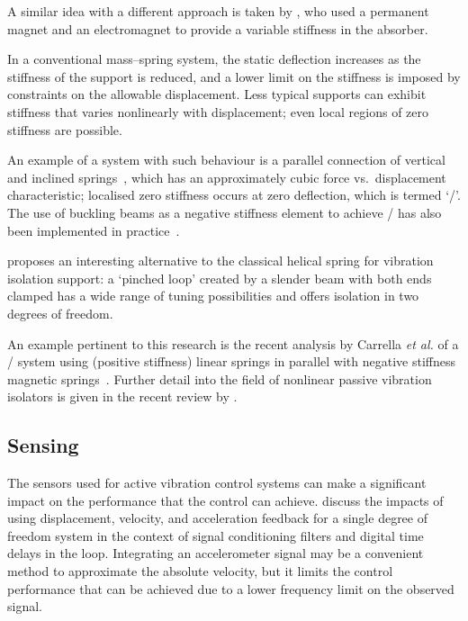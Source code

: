A similar idea with a different approach is taken by
\textcite{liu2006a}, who used a permanent magnet and an electromagnet
to provide a variable stiffness in the absorber.

In a conventional mass--spring system, the static deflection increases
as the stiffness of the support is reduced, and a lower limit on the
stiffness is imposed by constraints on the allowable
displacement.
Less typical supports can exhibit stiffness that varies
nonlinearly with displacement; even local regions of zero stiffness
are possible.

An example of a system with such behaviour is a parallel
connection of vertical and inclined
springs~\cite{molyneux1957,alabuzhev1989,carrella2006,carrella2007},
which has an approximately cubic force vs.\ displacement
characteristic; localised zero stiffness occurs at zero deflection,
which is termed `\qzs/'.
The use of buckling beams as a negative
stiffness element to achieve \qzs/ has also been implemented in
practice~\cite{platus1999,tarnai2003}.

\textcite{virgin2008} proposes an interesting alternative to the
classical helical spring for vibration isolation support: a `pinched
loop' created by a slender beam with both ends clamped has a wide
range of tuning possibilities and offers isolation in two degrees of
freedom.

An example pertinent to this
research is the recent analysis by Carrella \emph{et al.} of a \qzs/
system using (positive stiffness) linear springs in parallel with negative
stiffness magnetic springs~\cite{carrella2008}.
Further detail into the
field  of nonlinear passive vibration isolators is given in the recent
review by \textcite{ibrahim2008}.

\subsection{Sensing}

The sensors used for active vibration control systems can make a significant impact on the performance that the control can achieve.
\textcite{brennan2007} discuss the impacts of using displacement, velocity, and acceleration feedback for a single degree of freedom system in the context of signal conditioning filters and digital time delays in the loop.
Integrating an accelerometer signal may be a convenient method to approximate the absolute velocity, but it limits the control performance that can be achieved due to a lower frequency limit on the observed signal.

